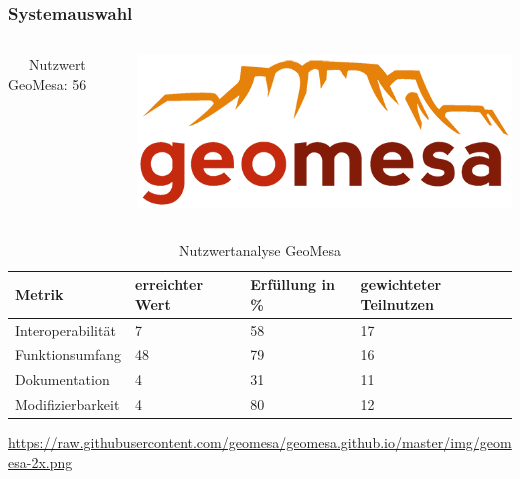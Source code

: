 \documentclass{beamer}
\begin{document}
\begin{frame}\frametitle{Systemauswahl}

   \begin{columns}
    \begin{column}{.5\textwidth}
\ \ \ Nutzwert GeoMesa: 56
    \end{column}
    \begin{column}{.5\textwidth}
    \includegraphics[width=.7\hsize]{geomesa.png}
    \end{column}
  \end{columns}

\begin{table}
\begin{tabular}{|l|p{1.8cm}|l|p{1.9cm}|}
\hline
\textbf{Metrik} & \textbf{erreichter Wert} & \textbf{Erfüllung in \%} & \textbf{gewichteter Teilnutzen} \\ \hline
Interoperabilität & 7 & 58 & 17 \\ \hline
Funktionsumfang & 48 & 79 & 16 \\ \hline
Dokumentation & 4 & 31 & 11 \\ \hline
Modifizierbarkeit & 4 & 80 & 12 \\ \hline
\end{tabular}
\caption{Nutzwertanalyse GeoMesa}
\end{table}

\begin{center}
\tiny
\url{https://raw.githubusercontent.com/geomesa/geomesa.github.io/master/img/geomesa-2x.png}
\end{center}

\end{frame}
\end{document}
